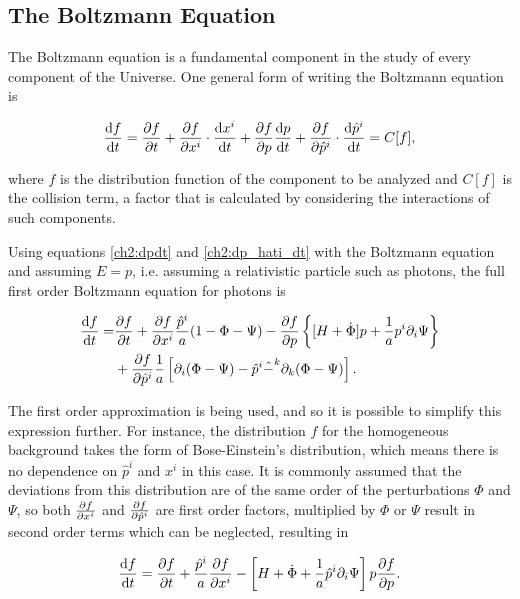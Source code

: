 \documentclass[openany,a4paper,12pt,oneside]{book}
\begin{document}
\begin{spacing}{1.5}
\subsection{The Boltzmann Equation}

The Boltzmann equation is a fundamental component in the study of every component of the Universe. One general form of writing the Boltzmann equation is

\begin{equation}\label{ch2:Boltzmann_general}
    \dv{f}{t}=\pdv{f}{t}+\pdv{f}{x^i}\cdot \dv{x^i}{t}+\pdv{f}{p}\dv{p}{t}+\pdv{f}{\hat{p}^i}\cdot \dv{\hat{p}^i}{t}=C[f],
\end{equation}

\noindent where $f$ is the distribution function of the component to be analyzed and $C[f]$ is the collision term, a factor that is calculated by considering the interactions of such components.

Using equations \eqref{ch2:dpdt} and \eqref{ch2:dp_hati_dt} with the Boltzmann equation and assuming $E=p$, i.e. assuming a relativistic particle such as photons, the full first order Boltzmann equation for photons is

\begin{equation}\label{ch2:full_photon_boltzmann_eq}
\begin{split}
    \dv{f}{t}=&\pdv{f}{t}+\pdv{f}{x^i}\frac{\hat{p}^i}{a}(1-\Phi-\Psi)-\pdv{f}{p}\left\{[H+\dot{\Phi}]p +\frac{1}{a}p^i\partial_i\Psi\right\}\\
    &+\pdv{f}{\hat{p}^i}\frac{1}{a}\left[\partial_i(\Phi-\Psi)-\hat{p}^i\hat{-}^k\partial_k(\Phi-\Psi)\right].
\end{split}
\end{equation}

The first order approximation is being used, and so it is possible to simplify this expression further. For instance, the distribution $f$ for the homogeneous background takes the form of Bose-Einstein's distribution, which means there is no dependence on $\hat{p}^i$ and $x^i$ in this case. It is commonly assumed that the deviations from this distribution are of the same order of the perturbations $\Phi$ and $\Psi$, so both $\pdv{f}{x^i}$ and $\pdv{f}{\hat{p}^i}$ are first order factors, multiplied by $\Phi$ or $\Psi$ result in second order terms which can be neglected, resulting in

\begin{equation}\label{ch2:Boltzmann_photon_final}
    \dv{f}{t}=\pdv{f}{t}+\frac{\hat{p}^i}{a}\pdv{f}{x^i}-\left[H+\dot{\Phi}+\frac{1}{a}\hat{p}^i\partial_i\Psi\right]p\pdv{f}{p}.
\end{equation}


\end{spacing}
\end{document}
